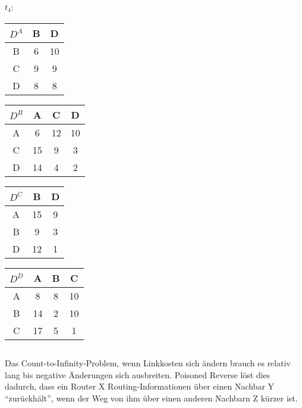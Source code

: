 \documentclass[a4paper]{article}
\begin{document}
\paragraph{$t_4:$}
\begin{center}
  \begin{tabular}{|c|c|c|}
    \hline
    $D^A$ & B & D \\ \hline
    B & 6 & 10 \\ \hline
    C & 9 &  9\\ \hline
    D & 8 &8  \\
    \hline
  \end{tabular}
  \begin{tabular}{|c|c|c|c|}
    \hline
    $D^B$ & A & C & D \\ \hline
    A & 6 & 12 & 10  \\ \hline
    C & 15 &9 &  3\\ \hline
    D &  14&  4& 2 \\
    \hline
  \end{tabular}
  \begin{tabular}{|c|c|c|}
    \hline
    $D^C$ & B & D \\ \hline
    A &15 & 9 \\ \hline
    B & 9 & 3\\ \hline
    D &  12& 1 \\
    \hline
  \end{tabular}
  \begin{tabular}{|c|c|c|c|}
    \hline
    $D^D$ & A & B & C \\ \hline
    A & 8 & 8 & 10 \\ \hline
    B & 14 &2 & 10 \\ \hline
    C &  17 & 5 & 1 \\
    \hline
  \end{tabular}
\end{center}

\subsection{}
Das Count-to-Infinity-Problem, wenn Linkkosten sich ändern brauch es relativ lang bis negative Änderungen sich ausbreiten.
Poisoned Reverse löst dies dadurch, dass ein Router X Routing-Informationen über einen Nachbar Y ``zurückhält'', wenn der Weg von ihm über einen anderen Nachbarn Z kürzer ist.
\subsection{}
\end{document}
